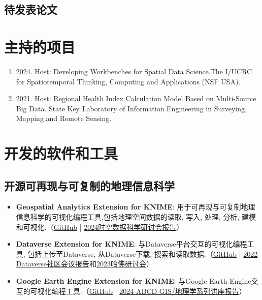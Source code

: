 \documentclass[11pt]{article}
\begin{document}
\subsection*{待发表论文}
\label{working-papers}
\newrefcontext[labelprefix=W]
\printbibliography[type=misc,heading=none,resetnumbers=true,keyword=R]

\section*{主持的项目}

\begin{enumerate}
	\item 2024. Host: Developing Workbenches for Spatial Data Science.The I/UCRC for Spatiotemporal Thinking, Computing and Applications (NSF USA).
	\item 2021. Host: Regional Health Index Calculation Model Based on Multi-Source Big Data. State Key Laboratory of Information Engineering in Surveying, Mapping and Remote Sensing.
\end{enumerate}

\section*{开发的软件和工具}
\label{tools}

\subsection*{\textbf{开源可再现与可复制的地理信息科学}}
\begin{itemize}
	\item[] \textbf{Geospatial Analytics Extension for KNIME}: 用于可再现与可复制地理信息科学的可视化编程工具,包括地理空间数据的读取, 写入, 处理, 分析, 建模和可视化.（\href{https://github.com/spatial-data-lab/knime-geospatial-extension}{GitHub} | \href{https://sdl.gis.harvard.edu/sites/projects.iq.harvard.edu/files/agenda_2024_3_1.pdf}{2024时空数据科学研讨会报告}）

	\item[] \textbf{Dataverse Extension for KNIME}: 与Dataverse平台交互的可视化编程工具, 包括上传至Dataverse, 从Dataverse下载, 搜索和读取数据.（\href{https://github.com/spatial-data-lab/knime-dataverse-extension}{GitHub} | \href{https://projects.iq.harvard.edu/dcm2022/agenda}{2022 Dataverse社区会议报告}和\href{https://gis.harvard.edu/event/integrating-cloud-computing-knime-platform-monitoring-deforestation}{2023哈佛研讨会}）

	\item[] \textbf{Google Earth Engine Extension for KNIME}: 与Google Earth Engine交互的可视化编程工具.（\href{https://github.com/spatial-data-lab/knime-gee-extension}{GitHub} | \href{https://gis.harvard.edu/event/integrating-cloud-computing-knime-platform-monitoring-deforestation}{2024 ABCD-GIS/地理学系列讲座报告}）
\end{itemize}
\end{document}

